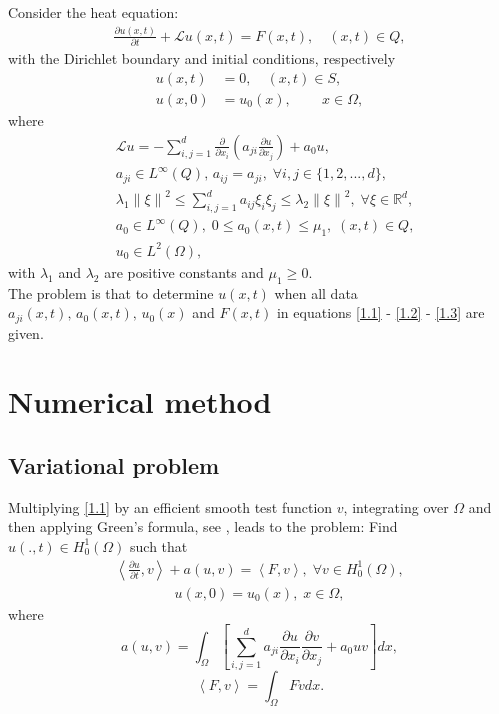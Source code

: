 \documentclass[twocolumn]{article}
\begin{document}
Consider the heat equation:
\begin{align}\label{1.1}
	\frac{\partial u(x, t)}{\partial t}+\mathcal{L}u(x, t)=F(x, t), \quad(x, t)\in Q,
\end{align}
with the Dirichlet boundary and initial conditions, respectively
\begin{align}
	u(x, t)&=0,\quad(x, t)\in S, \label{1.2}\\
	u(x, 0)&=u_0(x),\quad\quad\, x\in \Omega,\label{1.3}
\end{align}
where
\begin{align*}
	&\mathcal{L}u = -\sum_{i, j=1}^{d}\frac{\partial}{\partial x_i}\left(a_{ji}\frac{\partial u}{\partial x_j}\right)+a_0u,\\
	&a_{ji}\in L^{\infty}(Q),\, a_{ij}=a_{ji},\; \forall i, j\in \{1, 2, ..., d\},\\
	&\lambda_1\left\|\xi\right\|^2\leq \sum_{i, j=1}^{d}a_{ij}\xi_i\xi_j\leq \lambda_2\left\|\xi\right\|^2,\; \forall \xi\in\mathbb{R}^d,\\
	&a_0\in L^{\infty}(Q),\; 0\leq a_0(x, t)\leq \mu_1,\; (x, t)\in Q,\\ 
	&u_0\in L^2(\Omega),%
\end{align*}
with $\lambda_1$ and $\lambda_2$ are positive constants and $\mu_1\geq 0$.
\\

The problem is that to determine $u(x, t)$ when all data $a_{ji}(x, t),\,a_0(x, t),\,u_0(x)$ and $F(x, t)$ in equations \eqref{1.1} - \eqref{1.2} - \eqref{1.3} are given.
\section{Numerical method} 
\subsection{Variational problem}
\quad Multiplying \eqref{1.1} by an efficient smooth test function $v$, integrating over $\Omega$ and then applying Green's formula, see \cite{F05}, leads to the problem: Find $u(.,t)\in H^1_0(\Omega)$ such that
\begin{align}\label{2.1}
	\left\langle \frac{\partial u}{\partial t}, v \right\rangle+a\left(u, v\right)=\left\langle F, v \right\rangle,\; \forall v\in H^1_0(\Omega),
\end{align} 
\begin{align}\label{2.2}
	u(x, 0)=u_0(x), \; x\in \Omega,
\end{align}
where 
$$a\left(u, v\right)=\int_{\Omega}\left[\sum_{i, j=1}^{d}a_{ji}\frac{\partial u}{\partial x_i}\frac{\partial v}{\partial x_j}+a_0uv\right]dx,$$
$$\left\langle F, v \right\rangle=\int_{\Omega}F vdx.$$
\end{document}
